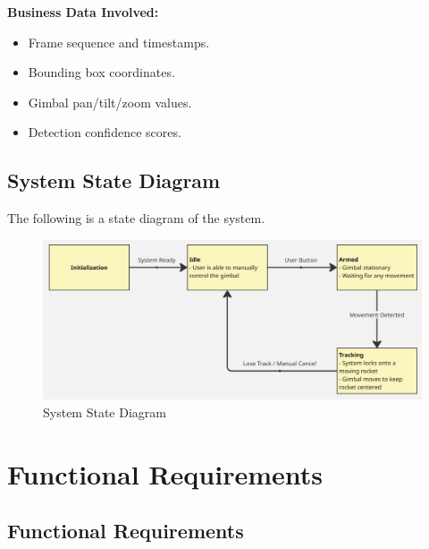 \documentclass[12pt]{article}
\begin{document}
\textbf{Business Data Involved:}
\begin{itemize}
  \item Frame sequence and timestamps.
  \item Bounding box coordinates.
  \item Gimbal pan/tilt/zoom values.
  \item Detection confidence scores.
\end{itemize}

\subsection{System State Diagram}

The following is a state diagram of the system.

\FloatBarrier
\begin{figure}[h]
  \centering
  \includegraphics[width=\textwidth,height=\textheight,keepaspectratio]{../Images/state_diagram.png}
  \caption{System State Diagram}
  \label{img:state-diagram}
\end{figure}
\FloatBarrier

\section{Functional Requirements}
\subsection{Functional Requirements}
\end{document}
